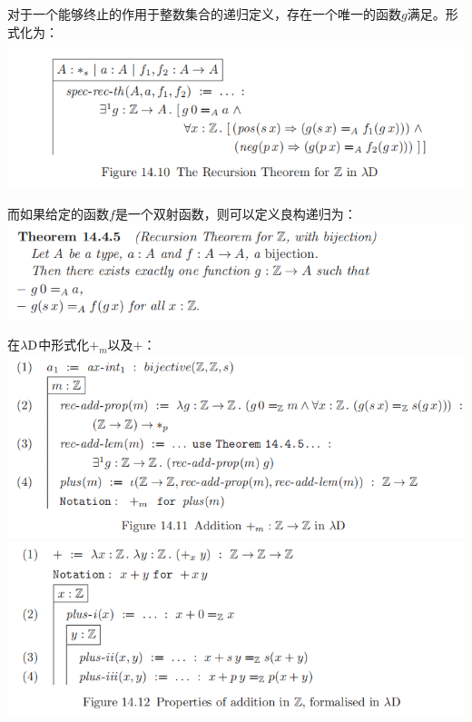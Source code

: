 \documentclass[UTF8]{article}
\begin{document}
		对于一个能够终止的作用于整数集合的递归定义，存在一个唯一的函数$g$满足。形式化为：\\
		\includegraphics[width=0.93\linewidth]{"../imgs/14-8.png"}
		
		而如果给定的函数$f$是一个双射函数，则可以定义良构递归为：\\
		\includegraphics[width=0.93\linewidth]{"../imgs/14-9.png"}
		
		在$\lambda{\rm D}$中形式化$+_m$以及$+$：\\
		\includegraphics[width=0.93\linewidth]{"../imgs/14-10.png"}\\
		\includegraphics[width=0.93\linewidth]{"../imgs/14-11.png"}
	
\end{document}
